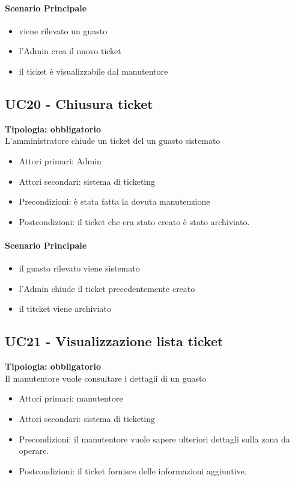 \documentclass[12pt]{article}
\begin{document}
\paragraph{Scenario Principale}
\begin{itemize}
	\item viene rilevato un guasto
	\item l'Admin crea il nuovo ticket
	\item il ticket è visualizzabile dal manutentore
\end{itemize}


\subsection{UC20 - Chiusura ticket}
\textbf{Tipologia: obbligatorio}\\
L'amministratore chiude un ticket del un guasto sistemato
\begin{itemize}
	\item Attori primari: Admin
	\item Attori secondari: sistema di ticketing
	\item Precondizioni: è stata fatta la dovuta manutenzione
	\item Postcondizioni: il ticket che era stato creato è stato archiviato. 
\end{itemize}
\paragraph{Scenario Principale}
\begin{itemize}
	\item il guasto rilevato viene sistemato
	\item l'Admin chiude il ticket precedentemente creato
	\item il titcket viene archiviato
\end{itemize}


\subsection{UC21 - Visualizzazione lista ticket}
\textbf{Tipologia: obbligatorio}\\
Il manutentore vuole consultare i dettagli di un guasto
\begin{itemize}
	\item Attori primari: manutentore
	\item Attori secondari: sistema di ticketing
	\item Precondizioni: il manutentore vuole sapere ulteriori dettagli sulla zona da operare.
	\item Postcondizioni: il ticket fornisce delle informazioni aggiuntive.
\end{itemize}
\end{document}
